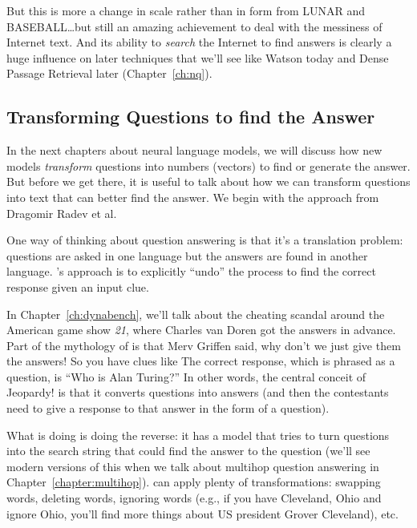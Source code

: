 
But this is more a change in scale rather than in form from LUNAR and
BASEBALL\dots but still an amazing achievement to deal with the
messiness of Internet text.  And its ability to \emph{search} the
Internet to find answers is clearly a huge influence on later
techniques that we’ll see like Watson today and Dense Passage
Retrieval later (Chapter~\ref{ch:nq}).

\subsection{Transforming Questions to find the Answer}


In the next chapters about neural language models, we will discuss how new
models \emph{transform} questions into numbers (vectors) to find or generate
the answer.
%
But before we get there, it is useful to talk about how we can transform
questions into text that can better find the answer.
%
We begin with the  approach from Dragomir Radev et al.

One way of thinking about question answering is that it's a translation
problem: questions are asked in one language but the answers are found in
another language.
%
's approach is to explicitly ``undo'' the process to find the
correct response given an input clue.

In Chapter~\ref{ch:dynabench}, we'll talk about the cheating scandal
around the American game show \textit{21}, where Charles van Doren got
the answers in advance.
%
Part of the mythology of \jeopardy{} is that Merv Griffen said, why
don’t we just give them the answers!
%
So you have clues like 
%
The correct response, which is phrased as a question, is
``Who is Alan Turing?''
%
In other words, the central conceit of Jeopardy! is that it converts questions
into answers (and then the contestants need to give a response to that answer
in the form of a question).

What  is doing is doing the reverse: it has a model that
tries to turn questions into the search string that could find the
answer to the question (we'll see modern versions of this when we talk about
multihop question answering in Chapter~\ref{chapter:multihop}).
%
 can apply plenty of transformations: swapping words,
deleting words, ignoring words (e.g., if you have Cleveland, Ohio and ignore
Ohio, you’ll find more things about US president Grover Cleveland), etc.

